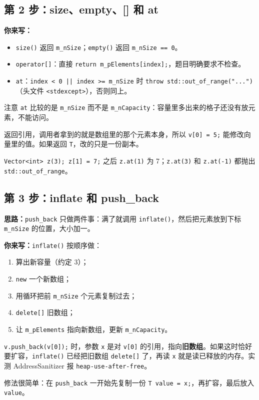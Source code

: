 \documentclass[11pt,a4paper]{article}
\newcommand{\code}[1]{\texttt{#1}}
\newcommand{\idea}{\textbf{思路：}}
\newcommand{\todo}{\textbf{你来写：}}
\begin{document}
\subsection{第 2 步：size、empty、[] 和 at}

\todo
\begin{itemize}
  \item \code{size()} 返回 \code{m\_nSize}；\code{empty()} 返回 \code{m\_nSize == 0}。
  \item \code{operator[]}：直接 \code{return m\_pElements[index];}，题目明确要求不检查。
  \item \code{at}：\code{index < 0 || index >= m\_nSize} 时 \code{throw std::out\_of\_range("...")}（头文件 \code{<stdexcept>}），否则同上。
\end{itemize}

注意 \code{at} 比较的是 \code{m\_nSize} 而不是 \code{m\_nCapacity}：容量里多出来的格子还没有放元素，不能访问。

\begin{tip}[为什么返回 T\&]
返回引用，调用者拿到的就是数组里的那个元素本身，所以 \code{v[0] = 5;} 能修改向量里的值。如果返回 \code{T}，改的只是一份副本。
\end{tip}

\begin{done}
\code{Vector<int> z(3); z[1] = 7;} 之后 \code{z.at(1)} 为 7；\code{z.at(3)} 和 \code{z.at(-1)} 都抛出 \code{std::out\_of\_range}。
\end{done}

\subsection{第 3 步：inflate 和 push\_back}

\idea \code{push\_back} 只做两件事：满了就调用 \code{inflate()}，然后把元素放到下标 \code{m\_nSize} 的位置，大小加一。

\todo \code{inflate()} 按顺序做：
\begin{enumerate}
  \item 算出新容量（约定 3）；
  \item \code{new} 一个新数组；
  \item 用循环把前 \code{m\_nSize} 个元素复制过去；
  \item \code{delete[]} 旧数组；
  \item 让 \code{m\_pElements} 指向新数组，更新 \code{m\_nCapacity}。
\end{enumerate}

\begin{tip}
\code{v.push\_back(v[0]);} 时，参数 \code{x} 是对 \code{v[0]} 的引用，指向\textbf{旧数组}。如果这时恰好要扩容，\code{inflate()} 已经把旧数组 \code{delete[]} 了，再读 \code{x} 就是读已释放的内存。实测 AddressSanitizer 报 \code{heap-use-after-free}。

修法很简单：在 \code{push\_back} 一开始先复制一份 \code{T value = x;}，再扩容，最后放入 \code{value}。
\end{tip}
\end{document}
